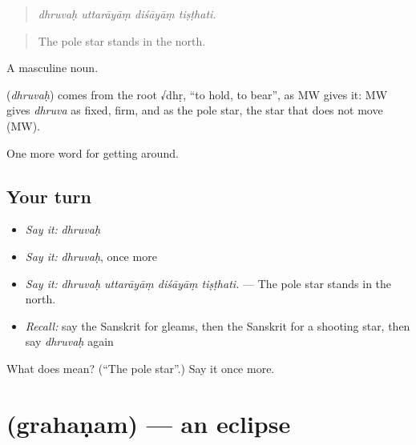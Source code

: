 \begin{quote}
   
\end{quote}

\begin{quote}
\emph{dhruvaḥ uttarāyāṃ diśāyāṃ tiṣṭhati.}
\end{quote}

\begin{quote}
The pole star stands in the north.
\end{quote}

A masculine noun.

\begin{cousinweb}
\textbf{} (\emph{dhruvaḥ}) comes from the root √dhṛ, \textquotedblleft{}to hold, to bear\textquotedblright{}, as MW gives it: MW gives \emph{dhruva} as fixed, firm, and as the pole star, the star that does not move (MW).
\end{cousinweb}

\begin{grammarlens}[title={What you've built}]
One more word for getting around.
\end{grammarlens}

\subsection*{Your turn}
\begin{itemize}
\raggedright
  \item \emph{Say it:} \emph{dhruvaḥ}
  \item \emph{Say it:} \emph{dhruvaḥ}, once more
  \item \emph{Say it:} \emph{dhruvaḥ uttarāyāṃ diśāyāṃ tiṣṭhati.} — The pole star stands in the north.
  \item \emph{Recall:} say the Sanskrit for gleams, then the Sanskrit for a shooting star, then say \emph{dhruvaḥ} again
\end{itemize}

\begin{tcolorbox}[breakable,colback=teal!4,colframe=teal!35!black,title={Before you move on}]
What does  mean? (\textquotedblleft{}The pole star\textquotedblright{}.) Say it once more.
\end{tcolorbox}
\section[\texorpdfstring{\sk{ग्रहणम्} (grahaṇam)}{ग्रहणम् (grahaṇam)}]{ (grahaṇam) — an eclipse}

